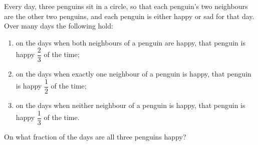 Every day, three penguins sit in a circle, so that each penguin's two neighbours are the other two penguins, and each penguin is either happy or sad for that day. Over many days the following hold:
\begin{enumerate}
\item on the days when both neighbours of a penguin are happy, that penguin is happy $\dfrac23$ of the time;
\item on the days when exactly one neighbour of a penguin is happy, that penguin is happy $\dfrac12$ of the time;
\item on the days when neither neighbour of a penguin is happy, that penguin is happy $\dfrac13$ of the time.
\end{enumerate}
On what fraction of the days are all three penguins happy?
